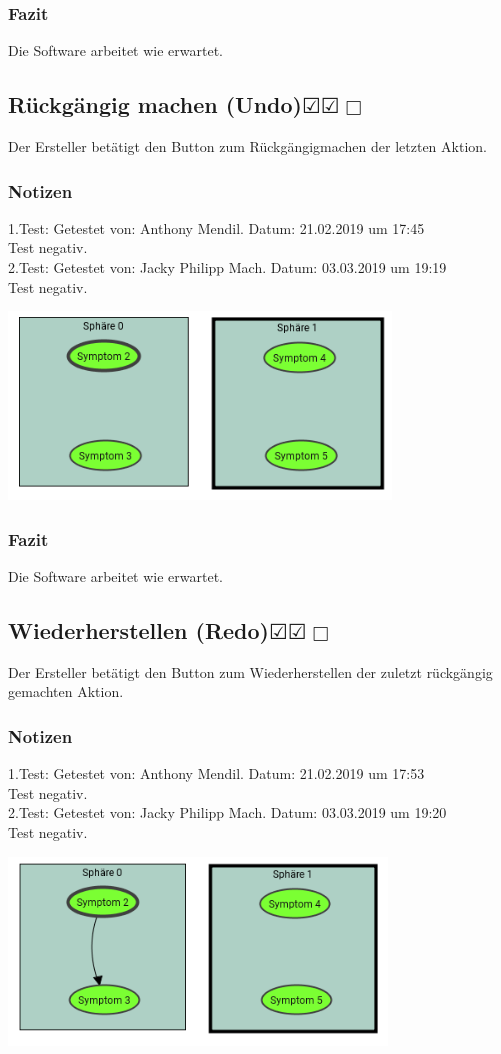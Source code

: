 \documentclass[enabledeprecatedfontcommands]{scrartcl}
\newcommand{\subsectiont}[2]{\subsection[#1]{#1{\normalsize\normalfont #2}}}
\newcommand{\leer}{$\Box$}
\newcommand{\ok}{$\CheckedBox$}
\begin{document}
\subsubsection{Fazit}
Die Software arbeitet wie erwartet.

\subsectiont{Rückgängig machen (Undo)}{\dotfill\ok\ok\leer}
Der Ersteller betätigt den Button zum Rückgängigmachen der letzten Aktion.
\subsubsection{Notizen}
1.Test: Getestet von: Anthony Mendil. Datum: 21.02.2019 um 17:45 \\
Test negativ.\\
2.Test: Getestet von: Jacky Philipp Mach. Datum: 03.03.2019 um 19:19 \\
Test negativ.
\begin{center}
\includegraphics[height=5cm]{1_7neu.PNG}
\end{center}
\subsubsection{Fazit}
Die Software arbeitet wie erwartet.

\subsectiont{Wiederherstellen (Redo)}{\dotfill\ok\ok\leer}
Der Ersteller betätigt den Button zum Wiederherstellen der zuletzt rückgängig gemachten Aktion. 
\subsubsection{Notizen}
1.Test: Getestet von: Anthony Mendil. Datum: 21.02.2019 um 17:53 \\
Test negativ.\\
2.Test: Getestet von: Jacky Philipp Mach. Datum: 03.03.2019 um 19:20 \\
Test negativ.
\begin{center}
\includegraphics[height=5cm]{1_8neu.PNG}
\end{center}
\end{document}

